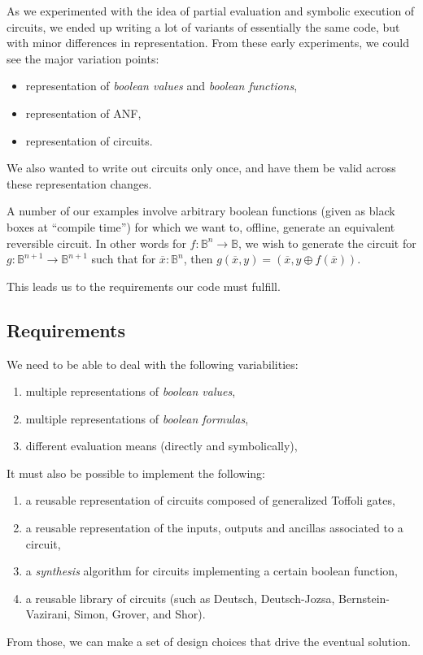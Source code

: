 \documentclass[sigplan]{acmart}
\newcommand{\Bool}{\ensuremath{\mathbb{B}}}
\begin{document}
As we experimented with the idea of partial evaluation and symbolic
execution of circuits, we ended up writing a lot of variants of
essentially the same code, but with minor differences in representation.
From these early experiments, we could see the major variation points:
\begin{itemize}
  \item representation of \emph{boolean values} and \emph{boolean functions},
  \item representation of ANF,
  \item representation of circuits.
\end{itemize}
We also wanted to write out circuits only once, and have them be valid
across these representation changes.

A number of our examples involve arbitrary boolean functions (given as black
boxes at ``compile time'') for which we want to, offline, generate an
equivalent reversible circuit. In other words for $f : \Bool^n \rightarrow\Bool$,
we wish to generate the circuit for $g : \Bool^{n+1} \rightarrow \Bool^{n+1}$ such
that for $\overline{x} : \Bool^n$, then 
$g(\overline{x},y) = (\overline{x}, y \oplus f(\overline{x}))$.

This leads us to the requirements our code must fulfill.

\subsection{Requirements}

We need to be able to deal with the following variabilities:
\begin{enumerate}
  \item multiple representations of \emph{boolean values},
  \item multiple representations of \emph{boolean formulas},
  \item different evaluation means (directly and symbolically),
\end{enumerate}

\noindent It must also be possible to implement the following:
\begin{enumerate}[resume]
  \item a reusable representation of circuits composed of generalized Toffoli gates,
  \item a reusable representation of the inputs, outputs and ancillas associated to
    a circuit,
  \item a \emph{synthesis} algorithm for circuits implementing a certain boolean
    function,
  \item a reusable library of circuits (such as
    Deutsch, Deutsch-Jozsa, Bernstein-Vazirani, Simon, Grover, and Shor). 
\end{enumerate}
\noindent From those, we can make a
set of design choices that drive the eventual solution.
\end{document}
